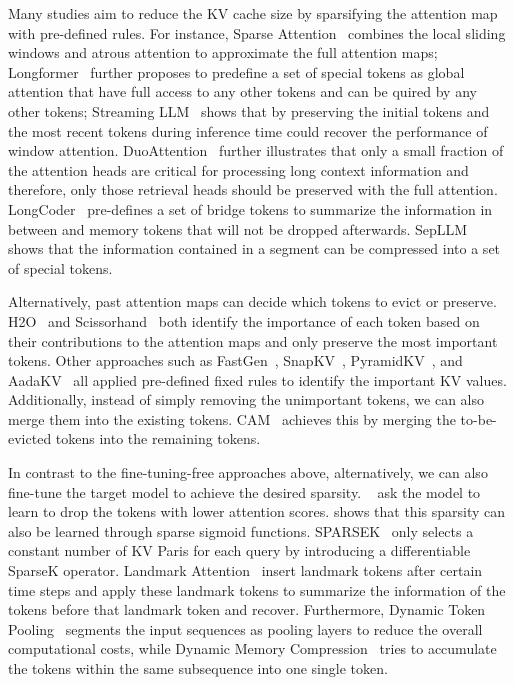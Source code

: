 Many studies aim to reduce the KV cache size by sparsifying the attention map with pre-defined rules. For instance, Sparse Attention~\citep{child-arxiv19a} combines the local sliding windows and atrous attention to approximate the full attention maps; Longformer~\citep{beltagy-arxiv20a} further proposes to predefine a set of special tokens as global attention that have full access to any other tokens and can be quired by any other tokens; Streaming LLM~\citep{xiao-arxiv23a} shows that by preserving the initial tokens and the most recent tokens during inference time could recover the performance of window attention. DuoAttention~\cite{xiao-arxiv24a} further illustrates that only a small fraction of the attention heads are critical for processing long context information and therefore, only those retrieval heads should be preserved with the full attention. LongCoder~\cite{guo-icml23a} pre-defines a set of bridge tokens to summarize the information in between and memory tokens that will not be dropped afterwards. SepLLM~\cite{chen-arxiv24a} shows that the information contained in a segment can be compressed into a set of special tokens. 

Alternatively, past attention maps can decide which tokens to evict or preserve. H2O~\citep{zhang-neurips23a}  and Scissorhand~\cite{liu-neurips23a} both identify the importance of each token based on their contributions to the attention maps and only preserve the most important tokens. Other approaches such as FastGen~\cite{ge-iclr24a}, SnapKV~\cite{li-arxiv24a}, PyramidKV~\cite{cai-arxiv24a}, and AadaKV~\cite{feng-arxiv24a} all applied pre-defined fixed rules to identify the important KV values. Additionally, instead of simply removing the unimportant tokens, we can also merge them into the existing tokens. CAM~\citep{zhang-icml24a} achieves this by merging the to-be-evicted tokens into the remaining tokens. 

In contrast to the fine-tuning-free approaches above,  alternatively, we can also fine-tune the target model to achieve the desired sparsity. ~\citet{kim-kdd22a} ask the model to learn to drop the tokens with lower attention scores. \citet{anagnostidis-neurips23a} shows that this sparsity can also be learned through sparse sigmoid functions. SPARSEK~\citep{lou-arxiv24a} only selects a constant number of KV Paris for each query by introducing a differentiable SparseK operator. Landmark Attention~\cite{mohtashami-neurips23a} insert landmark tokens after certain time steps and apply these landmark tokens to summarize the information of the tokens before that landmark token and recover. Furthermore, Dynamic Token Pooling~\citep{nawrot-acl23a} segments the input sequences as pooling layers to reduce the overall computational costs, while Dynamic Memory Compression~\citep{nawrot-icml24a}  tries to accumulate the tokens within the same subsequence into one single token. 

